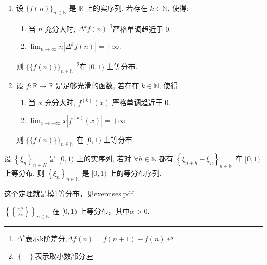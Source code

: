 \begin{theorem}[Fejer等分布定理]\label{Fejer等分布定理}
    \begin{enumerate}
        \item 设 $\{f(n)\}_{n \in \mathbb{N}}$ 是 $\mathbb{R}$ 上的实序列, 若存在 $k \in \mathbb{N}$, 使得:
              \begin{enumerate}
                  \item 当 $n$ 充分大时, $\Delta^k f(n)$ \footnote{$\Delta^k$表示k阶差分,$\Delta f(n)=f(n+1)-f(n)$.}严格单调趋近于 0.
                  \item $\displaystyle \lim _{n \rightarrow \infty} n\left|\Delta^k f(n)\right|=+\infty$.
              \end{enumerate}
              则 $\{\{f(n)\}\}_{n \in \mathbb{N}}$ \footnote{$\left\{-\right\}$表示取小数部分.}在 $[0,1)$ 上等分布.
        \item 设 $f: \mathbb{R} \rightarrow \mathbb{R}$ 是足够光滑的函数, 若存在 $k \in \mathbb{N}$, 使得
              \begin{enumerate}
                  \item 当 $x$ 充分大时, $f^{(k)}(x)$ 严格单调趋近于 0.
                  \item $\displaystyle \lim _{x \rightarrow+\infty} x\left|f^{(k)}(x)\right|=+\infty$
              \end{enumerate}
              则 $\{\{f(n)\}\}_{n \in \mathbb{N}}$ 在 $[0,1)$ 上等分布.
    \end{enumerate}
\end{theorem}

\begin{theorem}\label{Van Der Corput 差分定理}
    设 $\left\{\xi_n\right\}_{n \in N}$ 是 $[0,1)$ 上的实序列, 若对 $\forall h \in \mathbb{N}$ 都有 $\left\{\xi_{n+h}-\xi_n\right\}_{n \in \mathbb{N}}$ 在 $[0,1)$ 上等分布, 则 $\left\{\xi_n\right\}_{n \in \mathbb{N}}$ 是 $[0,1)$ 上的等分布序列.
\end{theorem}

\begin{note}
    这个定理就是模1等分布，见\href{https://easygl1der.github.io/MyWebsite/Book/exercises.pdf#page=30}{exercises.pdf}
\end{note}

\begin{corollary}
    $\displaystyle \left\{\left\{\frac{n^\alpha}{2 \pi} \right\}\right\}_{n \in \mathbb{N}}$ 在 $[0,1)$ 上等分布，其中$\alpha>0$.
\end{corollary}

